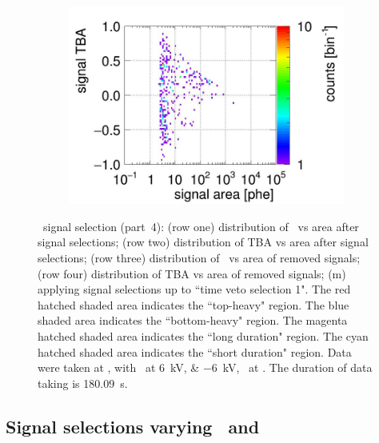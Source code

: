 \begin{landscape}
\begin{figure}[!p]
\begin{subfigure}[t]{0.33\textwidth}
		\includegraphics[width=\figurewidth,clip,trim={0 0 0 40}]{Figures/GasTest/CutsValid/res64767/tbapaX15Vecfig64767.jpg}
		\caption{}
		\label{fig:signal selection 15}
	\end{subfigure}
	\caption[\gtest\ signal selection (part~4).]{\gtest\ signal selection (part~4): 
			(row one) distribution of \rpdshort\ vs area after signal selections;
			(row two) distribution of TBA vs area after signal selections;
			(row three) distribution of \rpdshort\ vs area of removed signals;
			(row four) distribution of TBA vs area of removed signals;
		(m) applying signal selections up to ``time veto selection 1".
		The red hatched shaded area indicates the ``top-heavy" region.
		The blue shaded area indicates the ``bottom-heavy" region.
		The magenta hatched shaded area indicates the ``long duration" region.
		The cyan hatched shaded area indicates the ``short duration" region.
		Data were taken at , with \opvtvb\ at \SIlist{+6;-6}{kV}, \opgd\ at \standarddensity . The duration of data taking is \SI{180.09}{\s}.
	}
	\label{fig:signal selection l4}
\end{figure}
\end{landscape}


\subsection{Signal selections varying \opdv\ and \opgd }


